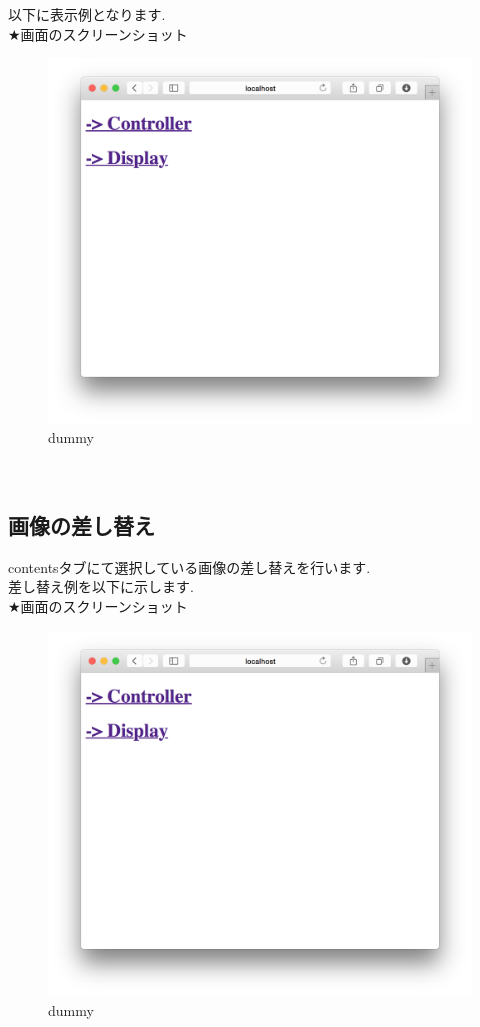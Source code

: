 \documentclass[a4paper,10pt,oneside]{jsbook}
\begin{document}
以下に表示例となります.\\
★画面のスクリーンショット
\begin{figure}[htbp]
	\begin{center}
		\includegraphics[width=11.5cm]{image/home.png}
	\end{center}
	\caption{dummy}
	\label{fig:home}
\end{figure}
\\


\subsection{画像の差し替え}
contentsタブにて選択している画像の差し替えを行います.\\
差し替え例を以下に示します.\\
★画面のスクリーンショット
\begin{figure}[htbp]
	\begin{center}
		\includegraphics[width=11.5cm]{image/home.png}
	\end{center}
	\caption{dummy}
	\label{fig:home}
\end{figure}
\\
\end{document}
